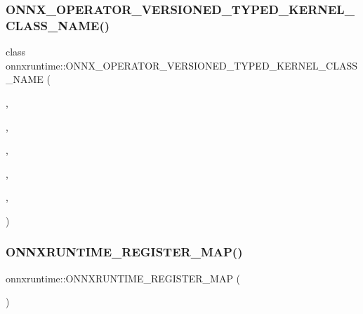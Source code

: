 \subsubsection{\texorpdfstring{O\+N\+N\+X\+\_\+\+O\+P\+E\+R\+A\+T\+O\+R\+\_\+\+V\+E\+R\+S\+I\+O\+N\+E\+D\+\_\+\+T\+Y\+P\+E\+D\+\_\+\+K\+E\+R\+N\+E\+L\+\_\+\+C\+L\+A\+S\+S\+\_\+\+N\+A\+M\+E()}{ONNX\_OPERATOR\_VERSIONED\_TYPED\_KERNEL\_CLASS\_NAME()}\hspace{0.1cm}{\footnotesize\ttfamily [2/2]}}
{\footnotesize\ttfamily class onnxruntime\+::\+O\+N\+N\+X\+\_\+\+O\+P\+E\+R\+A\+T\+O\+R\+\_\+\+V\+E\+R\+S\+I\+O\+N\+E\+D\+\_\+\+T\+Y\+P\+E\+D\+\_\+\+K\+E\+R\+N\+E\+L\+\_\+\+C\+L\+A\+S\+S\+\_\+\+N\+A\+ME (\begin{DoxyParamCaption}\item[{\mbox{\hyperlink{namespaceonnxruntime_a394a3c7e50622de1f203a96df592060d}{k\+Cpu\+Execution\+Provider}}}]{,  }\item[{\mbox{\hyperlink{namespaceonnxruntime_ac0e7c0c106a2c9e9594560a3ab289fa0}{k\+Onnx\+Domain}}}]{,  }\item[{7}]{,  }\item[{9}]{,  }\item[{float}]{,  }\item[{\mbox{\hyperlink{classonnxruntime_1_1Greater}{Greater}}}]{ }\end{DoxyParamCaption})}

\mbox{\label{namespaceonnxruntime_a8e441dc586feb02243cbf91dcd2a9906}} 
\subsubsection{\texorpdfstring{O\+N\+N\+X\+R\+U\+N\+T\+I\+M\+E\+\_\+\+R\+E\+G\+I\+S\+T\+E\+R\+\_\+\+M\+A\+P()}{ONNXRUNTIME\_REGISTER\_MAP()}\hspace{0.1cm}{\footnotesize\ttfamily [1/8]}}
{\footnotesize\ttfamily onnxruntime\+::\+O\+N\+N\+X\+R\+U\+N\+T\+I\+M\+E\+\_\+\+R\+E\+G\+I\+S\+T\+E\+R\+\_\+\+M\+AP (\begin{DoxyParamCaption}\item[{\mbox{\hyperlink{namespaceonnxruntime_ad08e9cd3839f6134e87cee3370f5d7b3}{Map\+String\+To\+String}}}]{ }\end{DoxyParamCaption})}


